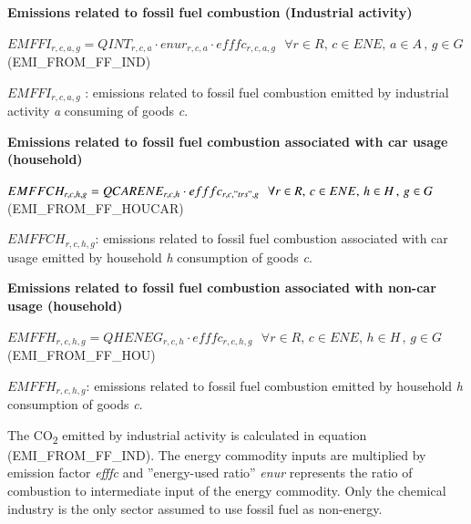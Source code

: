 \documentclass[10pt,a4paper,titlepage,dvipdfmx]{book}
\begin{document}
\begin{flushleft}\textbf{Emissions related to fossil fuel combustion (Industrial activity)}\end{flushleft}


\begin{center}$EMFFI_{r,c,a,g}=QINT_{r,c,a}\cdot enur_{r,c,a}\cdot efffc_{r,c,a,g}\,\,\,\,\forall r\in R,\,c\in ENE,\,a\in A\,,\,g\in G$ (EMI\_FROM\_FF\_IND)
\end{center}

\begin{flushleft} $EMFFI_{r,c,a,g}$ : emissions related to fossil fuel combustion emitted by industrial activity \textit{a} consuming of goods \textit{c}. \end{flushleft}

\begin{flushleft}\textbf{Emissions related to fossil fuel combustion associated with car usage (household)}\end{flushleft}


\begin{center}$EMFFCH_{r,c,h,g}=QCARENE_{r,c,h}\cdot efffc_{r,c,"trs",g}\,\,\,\,\forall r\in R,\,c\in ENE,\,h\in H\,,\,g\in G$ (EMI\_FROM\_FF\_HOUCAR)
\end{center}

\begin{flushleft} $EMFFCH_{r,c,h,g}$: emissions related to fossil fuel combustion associated with car usage emitted by household \textit{h} consumption of goods \textit{c}. \end{flushleft}

\begin{flushleft}\textbf{Emissions related to fossil fuel combustion associated with non-car usage (household)}\end{flushleft}


\begin{center}$EMFFH_{r,c,h,g}=QHENEG_{r,c,h}\cdot efffc_{r,c,h,g}\,\,\,\,\forall r\in R,\,c\in ENE,\,h\in H\,,\,g\in G$ (EMI\_FROM\_FF\_HOU)
\end{center}

\begin{flushleft} $EMFFH_{r,c,h,g}$: emissions related to fossil fuel combustion emitted by household \textit{h} consumption of goods \textit{c}. \end{flushleft}

      The CO\textsubscript{2} emitted by industrial activity is calculated in equation (EMI\_FROM\_FF\_IND). The energy commodity inputs are multiplied by emission factor \textit{efffc} and ''energy-used ratio'' \textit{enur} represents the ratio of combustion to intermediate input of the energy commodity. Only the chemical industry is the only sector assumed to use fossil fuel as non-energy.
\end{document}
